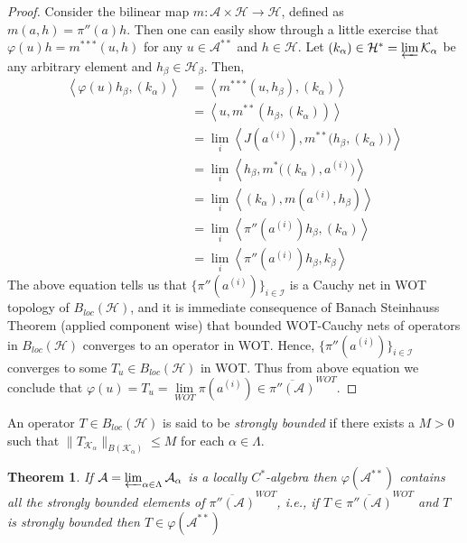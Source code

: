 \documentclass[10pt]{article}
\newtheorem{theorem}{Theorem}[section]
\theoremstyle{definition}
\begin{document}
\begin{proof}
	Consider the bilinear map $m:\mathcal A\times \mathcal H \to \mathcal H$, defined as $m(a,h)=\pi''(a)h$. Then one can easily show through a little exercise that $\varphi(u)h=m^{***}(u,h)$ for any $u\in \mathcal A^{**}$ and $h\in \mathcal H$. Let $(k_\alpha)\in \mathcal H^*=\varprojlim \mathcal K_\alpha$ be any arbitrary element and $h_\beta\in \mathcal H_\beta$. Then, 
	\begin{align*}
		\left<\varphi(u)h_\beta,(k_\alpha)\right>&=\left<m^{***}(u,h_\beta),(k_\alpha)\right>\\&=\left<u,m^{**}(h_\beta,(k_\alpha))\right>\\
		&=\lim_i \left<J(a^{(i)}), m^{**}\bigl(h_\beta, (k_\alpha)\bigr)\right>\\&=\lim_i\left<h_\beta,m^*\bigl((k_\alpha), a^{(i)}\bigr)\right>\\
		&=\lim_i\left<(k_\alpha),m(a^{(i)},h_\beta)\right>\\&=\lim_i\left<\pi''(a^{(i)})h_\beta,(k_\alpha)\right>\\&=\lim_i\left<\pi''(a^{(i)})h_\beta, k_\beta\right>
	\end{align*}
	The above equation tells us that $\{\pi''(a^{(i)})\}_{i\in \mathcal I}$ is a Cauchy net in WOT topology of $B_{loc}(\mathcal H)$, and it is immediate consequence of Banach Steinhauss Theorem (applied component wise) that bounded WOT-Cauchy nets of operators in $B_{loc}(\mathcal H)$ converges to an operator in WOT. Hence, $\{\pi''(a^{(i)})\}_{i\in \mathcal I}$ converges to some $T_u\in B_{loc}(\mathcal H)$ in WOT. Thus from above equation we conclude that $\varphi(u)=T_u=\underset{WOT}{\lim}\pi(a^{(i)})\in \overline{\pi''(\mathcal A)}^{WOT} $.
\end{proof}
An operator $T\in B_{loc}(\mathcal H)$ is said to be \emph{strongly bounded} if there exists a $M>0$ such that $\|T_{\mathcal K_\alpha}\|_{B(\mathcal K_\alpha)}\leq M$ for each $\alpha\in \Lambda$.
\begin{theorem}If $\mathcal A=\varprojlim_{\alpha\in \Lambda} \mathcal A_\alpha$ is a locally $C^*$-algebra then 
$\varphi(\mathcal A^{**})$ contains all the strongly bounded elements of $\overline{\pi''(\mathcal A)}^{WOT}$, i.e., if $T\in \overline{\pi''(\mathcal A)}^{WOT}$ and $T$ is strongly bounded then $T\in \varphi(\mathcal A^{**})$
\end{theorem}
\end{document}
